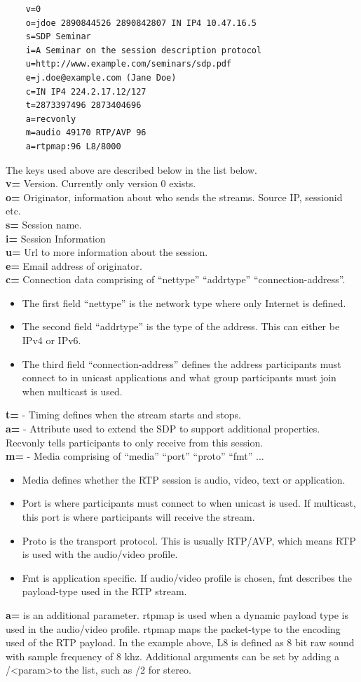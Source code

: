 \begin{verbatim}
    v=0
    o=jdoe 2890844526 2890842807 IN IP4 10.47.16.5
    s=SDP Seminar
    i=A Seminar on the session description protocol
    u=http://www.example.com/seminars/sdp.pdf
    e=j.doe@example.com (Jane Doe)
    c=IN IP4 224.2.17.12/127
    t=2873397496 2873404696
    a=recvonly
    m=audio 49170 RTP/AVP 96
    a=rtpmap:96 L8/8000
\end{verbatim}
The keys used above are described below in the list below. \\
\textbf{v=} Version. Currently only version 0 exists. \\
\textbf{o=} Originator, information about who sends the streams. Source IP, sessionid etc. \\
\textbf{s=} Session name. \\
\textbf{i=} Session Information \\
\textbf{u=} Url to more information about the session.\\
\textbf{e=} Email address of originator.\\
\textbf{c=} Connection data comprising of ``nettype'' ``addrtype'' ``connection-address''.
\begin{itemize}
	\item The first field ``nettype'' is the network type where only Internet is defined. 
	\item The second field ``addrtype'' is the type of the address. This can either be IPv4 or IPv6.
	\item The third field ``connection-address'' defines the address participants must connect to in unicast applications and what group participants must join when multicast is used.
\end{itemize}
\textbf{t=} - Timing defines when the stream starts and stops. \\
\textbf{a=} - Attribute used to extend the SDP to support additional properties. Recvonly tells participants to only receive from this session. \\
\textbf{m=} - Media comprising of ``media'' ``port'' ``proto'' ``fmt'' ...
\begin{itemize}
	\item Media defines whether the RTP session is audio, video, text or application.
	\item Port is where participants must connect to when unicast is used. If multicast, this port is where participants will receive the stream.
	\item Proto is the transport protocol. This is usually RTP/AVP, which means RTP is used with the audio/video profile.
	\item Fmt is application specific. If audio/video profile is chosen, fmt describes the payload-type used in the RTP stream.
\end{itemize}
\textbf{a=} is an additional parameter. rtpmap is used when a dynamic payload type is used in the audio/video profile. rtpmap maps the packet-type to the encoding used of the RTP payload. In the example above, L8 is defined as 8 bit raw sound with sample frequency of 8 khz. Additional arguments can be set by adding a /\textless param\textgreater to the list, such as /2 for stereo.

